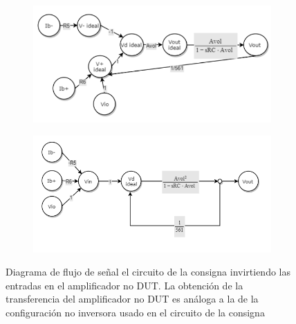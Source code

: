 \documentclass[../../main.tex]{subfiles}
\begin{document}
\begin{figure}[h]%
	\centering
	\begin{subfigure}[t]{0.49\textwidth}
		\centering
		\includegraphics[width=\textwidth]{imagenes/signal_flow_inv_noDUT.png}
		\caption{}
		\label{fig:ej_3_signal_flow_inv_noDUT_no_simplificado}
	\end{subfigure}%
	\hfill%
	\begin{subfigure}[t]{0.49\textwidth}
		\centering
		\includegraphics[width=\textwidth]{imagenes/signal_flow_inv_noDUT_simplificado.png}
		\caption{}
		\label{fig:ej_3_signal_flow_inv_noDUT_simplificado}
	\end{subfigure}
	\caption{Diagrama de flujo de se\~nal el circuito de la consigna invirtiendo las entradas en el amplificador no DUT. La obtenci\'on de la transferencia del amplificador no DUT es an\'aloga a la de la configuraci\'on no inversora usado en el circuito de la consigna}
	\label{fig:ej_3_signal_flow_inv_noDUT}	
\end{figure}
\end{document}
